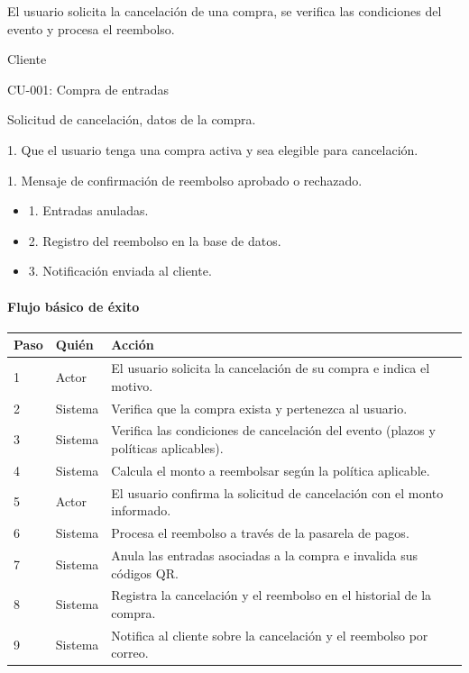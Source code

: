 \begin{description}[leftmargin=!, labelwidth=3.4cm, style=nextline, topsep=3pt]
\item[Objetivo] El usuario solicita la cancelación de una compra, se verifica las condiciones del evento y procesa el reembolso.

\item[Actores] Cliente

\item[CU relacionados] CU-001: Compra de entradas

\item[Entradas] Solicitud de cancelación, datos de la compra.

\item[Pre-condiciones] 1. Que el usuario tenga una compra activa y sea elegible para cancelación.

\item[Salidas] 1. Mensaje de confirmación de reembolso aprobado o rechazado.

\item[Post-condiciones] \hfill
\begin{itemize}[leftmargin=1.2em, topsep=1pt]
  \item 1. Entradas anuladas.
  \item 2. Registro del reembolso en la base de datos.
  \item 3. Notificación enviada al cliente.
\end{itemize}

\end{description}

\paragraph{Flujo básico de éxito}
\begin{longtable}{P{1.1cm}P{1.8cm}P{10.5cm}}
\toprule
\textbf{Paso} & \textbf{Quién} & \textbf{Acción}\\
\midrule
{} & Actor & El usuario solicita la cancelación de su compra e indica el motivo.\\
2 & Sistema & Verifica que la compra exista y pertenezca al usuario.\\
3 & Sistema & Verifica las condiciones de cancelación del evento (plazos y políticas aplicables).\\
4 & Sistema & Calcula el monto a reembolsar según la política aplicable.\\
5 & Actor & El usuario confirma la solicitud de cancelación con el monto informado.\\
6 & Sistema & Procesa el reembolso a través de la pasarela de pagos.\\
7 & Sistema & Anula las entradas asociadas a la compra e invalida sus códigos QR.\\
8 & Sistema & Registra la cancelación y el reembolso en el historial de la compra.\\
9 & Sistema & Notifica al cliente sobre la cancelación y el reembolso por correo.\\
\bottomrule
\end{longtable}

